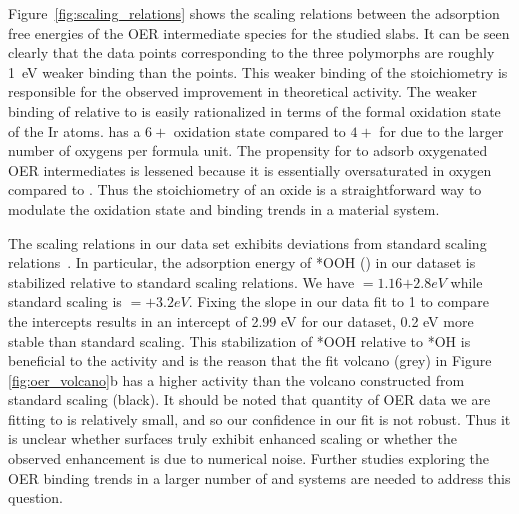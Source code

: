 %
%
Figure~\ref{fig:scaling_relations} shows the scaling relations between the adsorption free energies of the OER intermediate species for the studied \IrOx slabs.
%
It can be seen clearly that the data points corresponding to the three \IrOthree polymorphs are roughly \SI{1}{\electronvolt} weaker binding than the \rIrOtwo points.
%
This weaker binding of the \IrOthree stoichiometry is responsible for the observed improvement in theoretical activity.
%
The weaker binding of \IrOthree relative to \IrOtwo is easily rationalized in terms of the formal oxidation state of the Ir atoms.
%
\IrOthree has a $6+$ oxidation state compared to $4+$ for \IrOtwo due to the larger number of oxygens per formula unit.
%
The propensity for \IrOthree to adsorb oxygenated OER intermediates is lessened because it is essentially oversaturated in oxygen compared to \IrOtwo.
%
Thus the stoichiometry of an oxide is a straightforward way to modulate the oxidation state and binding trends in a material system.


%
%
The scaling relations in our \IrOx data set exhibits deviations from standard scaling relations~\cite{Man2011}.
%
In particular, the adsorption energy of *OOH (\DGOOH) in our dataset is stabilized relative to standard scaling relations.
%
We have
\DGOOH$=1.16$\DGOH$+2.8 eV$ while standard scaling is
\DGOOH$=$\DGOH$+3.2 eV$.
%
Fixing the slope in our data fit to \num{1} to compare the intercepts results in an intercept of \num{2.99} eV for our dataset,
0.2 eV more stable than standard scaling.
%
This stabilization of *OOH relative to *OH is beneficial to the activity and is the reason that the fit volcano (grey) in Figure \ref{fig:oer_volcano}b has a higher activity than the volcano constructed from standard scaling (black).
%
It should be noted that quantity of OER data we are fitting to is relatively small,
and so our confidence in our fit is not robust.
%
Thus it is unclear whether \IrOthree surfaces truly exhibit enhanced scaling or whether the observed enhancement is due to numerical noise.
%
Further studies exploring the OER binding trends in a larger number of \IrOtwo and \IrOthree systems are needed to address this question.


